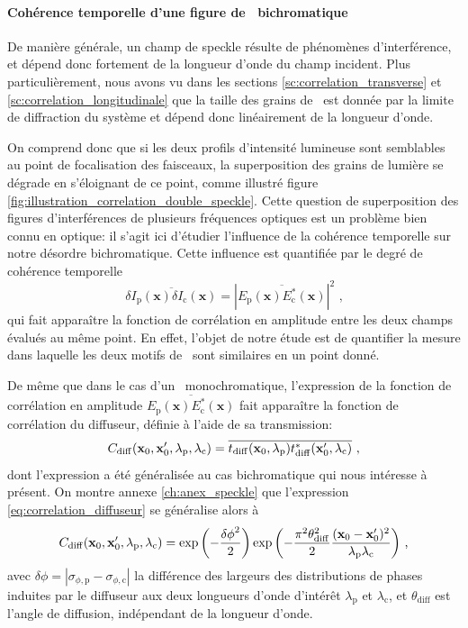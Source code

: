 \paragraph*{Cohérence temporelle d'une figure de \speckle\ bichromatique}
De manière générale, un champ de speckle résulte de phénomènes d'interférence, et dépend donc fortement de la longueur d'onde du champ incident. Plus particulièrement, nous avons vu dans les sections \ref{sc:correlation_transverse} et \ref{sc:correlation_longitudinale} que la taille des grains de \speckle\ est donnée par la limite de diffraction du système et dépend donc linéairement de la longueur d'onde. 

On comprend donc que si les deux profils d'intensité lumineuse sont semblables au point de focalisation des faisceaux, la superposition des grains de lumière se dégrade en s'éloignant de ce point, comme illustré figure \ref{fig:illustration_correlation_double_speckle}. Cette question de superposition des figures d'interférences de plusieurs fréquences optiques est un problème bien connu en optique: il s'agit ici d'étudier l'influence de la cohérence temporelle sur notre désordre bichromatique. Cette influence est quantifiée par le degré de cohérence temporelle
\begin{equation}
\overline{\delta I_{\mathrm{p}}(\mathbf{x}) \delta I_{\mathrm{c}} (\mathbf{x})} = \left| \overline{E_{\mathrm{p}}(\mathbf{x}) E^*_{\mathrm{c}}(\mathbf{x})} \right|^2 \text{ ,}
\end{equation}
qui fait apparaître la fonction de corrélation en amplitude entre les deux champs évalués au même point. En effet, l'objet de notre étude est de quantifier la mesure dans laquelle les deux motifs de \speckle\ sont similaires en un point donné.


De même que dans le cas d'un \speckle\ monochromatique, l'expression de la fonction de corrélation en amplitude $\overline{E_{\mathrm{p}}(\mathbf{x}) E^*_{\mathrm{c}}(\mathbf{x})}$ fait apparaître la fonction de corrélation du diffuseur, définie à l'aide de sa transmission:
\begin{equation}
C_{\mathrm{diff}}(\mathbf{x}_0,\mathbf{x}_0',\lambda_{\mathrm{p}},\lambda_{\mathrm{c}})=\overline{t_{\mathrm{diff}}(\mathbf{x}_0,\lambda_{\mathrm{p}})t_{\mathrm{diff}}^*(\mathbf{x}_0',\lambda_{\mathrm{c}})} \text{ ,}
\end{equation}
dont l'expression a été généralisée au cas bichromatique qui nous intéresse à présent. On montre annexe \ref{ch:anex_speckle} que l'expression \ref{eq:correlation_diffuseur} se généralise alors à
\begin{equation}
C_{\mathrm{diff}}(\mathbf{x}_0,\mathbf{x}_0',\lambda_{\mathrm{p}},\lambda_{\mathrm{c}})=\exp{\left( -\frac{{\delta\phi}^2}{2}\right) } \exp{\left( -\frac{\pi^2 \theta_{\mathrm{diff}}^2}{2}\frac{(\mathbf{x}_0- \mathbf{x}_0')^2}{\lambda_{\mathrm{p}} \lambda_{\mathrm{c}}} \right)} \text{ ,}
\end{equation}
avec $\delta\phi=\left| \sigma_{\phi,\mathrm{p}} - \sigma_{\phi,\mathrm{c}} \right|$  la différence des largeurs des distributions de phases induites par le diffuseur aux deux longueurs d'onde d'intérêt $\lambda_{\mathrm{p}}$ et $\lambda_{\mathrm{c}}$, et $\theta_{\mathrm{diff}}$ est l'angle de diffusion, indépendant de la longueur d'onde.


